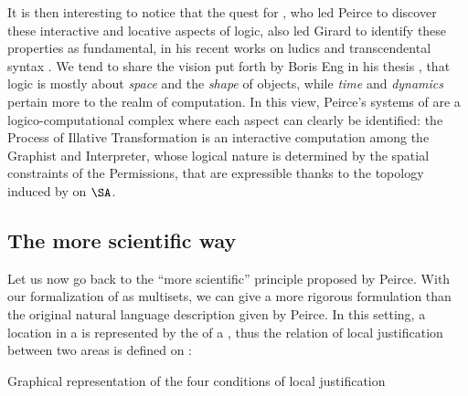 \begin{scope}
\begin{scope}
It is then interesting to notice that the quest for , who led
Peirce to discover these interactive and locative aspects of logic, also led
Girard to identify these properties as fundamental, in his recent works on
ludics \cite{girard_locus_2001} and transcendental syntax
\cite{eng_exegesis_2023}. We tend to share the vision put forth by Boris Eng in
his thesis \cite[\S 24.4]{eng_exegesis_2023}, that logic is mostly about
\emph{space} and the \emph{shape} of objects, while \emph{time} and
\emph{dynamics} pertain more to the realm of computation. In this view, Peirce's
systems of  are a logico-computational complex where each aspect can clearly
be identified: the Process of Illative Transformation is an interactive
computation among the Graphist and Interpreter, whose logical nature is
determined by the spatial constraints of the Permissions, that are expressible
thanks to the topology induced by  on $\SA$.

\subsection{The more scientific way}

Let us now go back to the ``more scientific''  principle
proposed by Peirce. With our formalization of  as multisets, we can
give a more rigorous formulation than the original natural language description
given by Peirce. In this setting, a location in a  is
represented by the  of a , thus the relation of local
justification between two areas is defined on :

\begin{marginfigure}
  
  \caption{Graphical representation of the four conditions of local
  justification}
\end{marginfigure}


\end{scope}
\end{scope}
